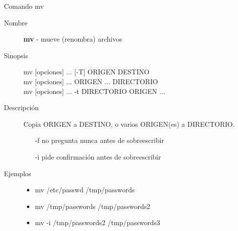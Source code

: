 \begin{frame}[c]{Comando mv}
  \begin{description}
    \item[Nombre]
      \textbf{mv} - mueve (renombra) archivos

    \vspace{\baselineskip}
    \item[Sinopsis]
      mv [opciones] ... [-T] ORIGEN DESTINO \\
      mv [opciones] ... ORIGEN ... DIRECTORIO \\
      mv [opciones] ... -t DIRECTORIO  ORIGEN ...

    \vspace{\baselineskip}
    \item[Descripción]
      Copia ORIGEN a DESTINO, o varios ORIGEN(es) a DIRECTORIO.

      \begin{itemize}
        \item [-f] no pregunta nunca antes de sobreescribir
        \item [-i] pide confirmación antes de sobreescribir
      \end{itemize}

    \vspace{\baselineskip}
    \item[Ejemplos]
      \begin{itemize}
        \item mv /etc/passwd /tmp/passwords
        \item mv /tmp/passwords /tmp/passwords2
        \item mv -i /tmp/passwords2 /tmp/passwords3
      \end{itemize}
  \end{description}
\end{frame}


